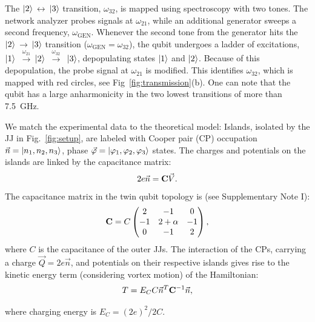 \documentclass[%
reprint,
superscriptaddress,
bibnotes,
amsmath,
amssymb,
aps,
showkeys,
prb,
]{revtex4-1}
\newcommand{\iket}[1]{\ensuremath{\Ket{#1}}}
\newcommand{\ira}{\ensuremath{\,\rightarrow\,}}
\newcommand{\ilra}{\ensuremath{\,\leftrightarrow\,}}
\newcommand{\iratext}[1]{\ensuremath{\,\xrightarrow{\text{#1}}\,}}
\begin{document}
{The  \iket{2}\ilra\iket{3}  transition,  $\omega_{32}$,   is  mapped  using
spectroscopy with two tones. The network  analyzer probes  signals at  $ \omega_{21}  $, while  an
additional generator  sweeps a second  frequency, $ \omega_{\text{GEN}}  $.  Whenever
the second tone from the generator hits the \iket{2}\ira\iket{3} transition
($\omega_{\text{GEN}}  = \omega_{32}  $), the  qubit  undergoes a  ladder of  excitations,
\iket{1}  \iratext{$\omega_{21}$}\iket{2}  \iratext{$\omega_{32}$} \iket{3},  depopulating
states \iket{1} and \iket{2}.  Because of this depopulation, the probe signal at $\omega_{21}$ is
modified.
This identifies  $\omega_{32}$, which  is mapped  with red  circles, see Fig~\ref{fig:transmission}(b).
One can note that the qubit has a large anharmonicity in the two lowest transitions of more than 7.5~GHz.

We match the  experimental data to the theoretical model: Islands,  isolated by the
JJ  in  Fig.~\ref{fig:setup},  are  labeled with  Cooper  pair  (CP)  occupation
$       \vec{n}      =       \iket{n_1,      n_2,       n_3}      $,       phase
$     \vec{\varphi}     =     \iket{\varphi_1,     \varphi_2,     \varphi_3}     $  states.  The charges and potentials on
the islands are linked by the capacitance matrix:
\begin{equation}
  \label{eq:link}
  2e\vec{n} = \bold{C}\vec{V}.
\end{equation}
The capacitance matrix in the twin qubit topology is (see Supplementary Note I):
\begin{equation}
  \bold{C} = C \begin{pmatrix}
    2  &  -1  &  0\\
    -1  &  2  +  \alpha  &  -1\\
    0  &  -1  & 2
  \end{pmatrix},
  \label{eq:capac}
\end{equation}
where $C$  is the capacitance of the outer  JJs.  The interaction
of the  CPs, carrying a  charge $ \vec{Q}=2e\vec{n}  $, and potentials  on their
respective islands gives rise to the kinetic energy term (considering vortex motion) of the Hamiltonian:
\begin{equation}\label{eq:potential}
  \begin{aligned}
    T = E_C C \vec{n}^{T}\bold{C}^{-1}\vec{n},
  \end{aligned}
\end{equation}

\noindent where charging energy is $ E_{C}={(2e)^{2}}/{2 C } $.

}
\end{document}
